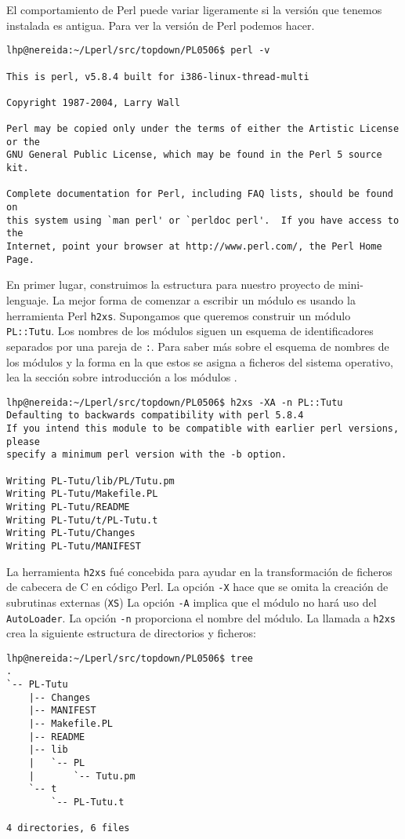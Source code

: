
El comportamiento de Perl puede variar ligeramente si la versión que tenemos instalada es 
antigua. Para ver la versión de Perl podemos hacer.

\begin{verbatim}
lhp@nereida:~/Lperl/src/topdown/PL0506$ perl -v

This is perl, v5.8.4 built for i386-linux-thread-multi

Copyright 1987-2004, Larry Wall

Perl may be copied only under the terms of either the Artistic License or the
GNU General Public License, which may be found in the Perl 5 source kit.

Complete documentation for Perl, including FAQ lists, should be found on
this system using `man perl' or `perldoc perl'.  If you have access to the
Internet, point your browser at http://www.perl.com/, the Perl Home Page.
\end{verbatim}


En primer lugar, construimos la estructura para nuestro proyecto de mini-lenguaje.
La mejor forma de comenzar a escribir un módulo es usando la herramienta Perl
\verb|h2xs|. Supongamos que queremos construir un módulo \verb|PL::Tutu|. 
Los nombres de los módulos siguen un esquema de identificadores separados
por una pareja de \verb|:|. Para saber más sobre el esquema de nombres 
de los módulos y la forma en la que estos se asigna a ficheros del sistema 
operativo, lea la sección 
sobre introducción a los módulos .

\begin{verbatim}
lhp@nereida:~/Lperl/src/topdown/PL0506$ h2xs -XA -n PL::Tutu
Defaulting to backwards compatibility with perl 5.8.4
If you intend this module to be compatible with earlier perl versions, please
specify a minimum perl version with the -b option.

Writing PL-Tutu/lib/PL/Tutu.pm
Writing PL-Tutu/Makefile.PL
Writing PL-Tutu/README
Writing PL-Tutu/t/PL-Tutu.t
Writing PL-Tutu/Changes
Writing PL-Tutu/MANIFEST
\end{verbatim}
La herramienta \verb|h2xs| fué concebida para ayudar en la transformación
de ficheros de cabecera de C en código Perl. La opción 
\verb|-X| hace que se omita la  creación de subrutinas externas (\verb|XS|)
La opción \verb|-A| implica que el módulo no hará uso del \verb|AutoLoader|.
La opción \verb|-n| proporciona el nombre del módulo.
La llamada a \verb|h2xs| crea la siguiente estructura de directorios y ficheros:
\begin{verbatim}
lhp@nereida:~/Lperl/src/topdown/PL0506$ tree
.
`-- PL-Tutu
    |-- Changes
    |-- MANIFEST
    |-- Makefile.PL
    |-- README
    |-- lib
    |   `-- PL
    |       `-- Tutu.pm
    `-- t
        `-- PL-Tutu.t

4 directories, 6 files
\end{verbatim}

